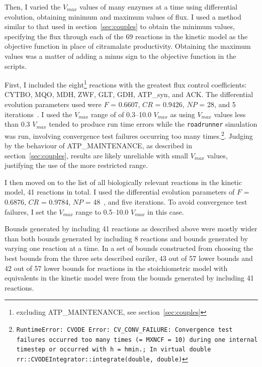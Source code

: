 \documentclass[parskip=full]{scrreprt}
\begin{document}
Then, I varied the $V_{max}$ values of many enzymes at a time using differential evolution, obtaining minimum and maximum values of flux. I used a method similar to that used in section~\ref{sec:couples} to obtain the minimum values, specifying the flux through each of the 69 reactions in the kinetic model as the objective function in place of citramalate productivity. Obtaining the maximum values was a matter of adding a minus sign to the objective function in the scripts.

First, I included the eight\footnote{excluding ATP\_MAINTENANCE, see section~\ref{sec:couples}} reactions with the greatest flux control coefficients: CYTBO, MQO, MDH, ZWF, GLT, GDH, ATP\_syn, and ACK. The differential evolution parameters used were $F$ = 0.6607, $CR$ = 0.9426, $NP$ = 28, and 5 iterations~\cite{pedersen_good_2010}. I used the $V_{max}$ range of of 0.3--10.0 $V_{max}$ as using $V_{max}$ values less than 0.3 $V_{max}$ tended to produce run time errors while the \texttt{roadrunner} simulation was run, involving convergence test failures occurring too many times.\footnote{\texttt{RuntimeError: CVODE Error: CV\_CONV\_FAILURE: Convergence test failures occurred too many times (= MXNCF = 10) during one internal timestep or occurred with \textbar{}h\textbar{} = hmin.; In virtual double rr::CVODEIntegrator::integrate(double, double)}}. Judging by the behaviour of ATP\_MAINTENANCE, as described in section~\ref{sec:couples}, results are likely unreliable with small $V_{max}$ values, justifying the use of the more restricted range.

I then moved on to the list of all biologically relevant reactions in the kinetic model, 41 reactions in total. I used the differential evolution parameters of $F$ = 0.6876, $CR$ = 0.9784, $NP$ = 48~\cite{pedersen_good_2010}, and five iterations. To avoid convergence test failures, I set the $V_{max}$ range to 0.5--10.0 $V_{max}$ in this case.

Bounds generated by including 41 reactions as described above were mostly wider than both bounds generated by including 8 reactions and bounds generated by varying one reaction at a time. In a set of bounds constructed from choosing the best bounds from the three sets described eariler, 43 out of 57 lower bounds and 42 out of 57 lower bounds for reactions in the stoichiometric model with equivalents in the kinetic model were from the bounds generated by including 41 reactions.
\end{document}
